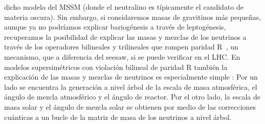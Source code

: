dicho modelo del MSSM (donde el neutralino es típicamente el candidato de materia
oscura). Sin embargo, si considaremos masas de gravitinos más
pequeñas, aunque ya no podríamos explicar bariogénesis a través de
leptogénesis, recuperamos la posibilidad de explicar las masas y
mezclas de los neutrinos a través de los operadores bilineales y
trilineales que rompen paridad R~\cite{Hirsch:2005ag}, un mecanismo,
que a diferencia del seesaw, si se puede verificar en el LHC.
En modelos supersimétricos con violación bilineal de paridad R también
la explicación de las masas y mezclas de neutrinos es especialmente
simple \cite{Hirsch:2000ef,Diaz:2003as,Hirsch:2004he,Hirsch:2008ur}: Por un lado se encuentra la
generación a nivel árbol de la escala de masa atmosférica, el ángulo
de mezcla atmosférico y el ángulo de reactor. Por el otro lado, la
escala de masa solar y el ángulo de mezcla solar se obtienen por medio
de las correcciones cuánticas a un bucle de la matriz de masa de los
neutrinos a nivel árbol.

